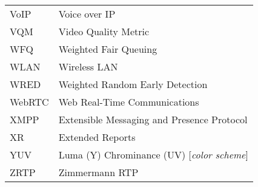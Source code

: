 \begin{longtable}{ll}
VoIP 	& Voice over IP \\
VQM 	& Video Quality Metric \\ 
WFQ 	& Weighted Fair Queuing \\
WLAN	& Wireless LAN \\
WRED 	& Weighted Random Early Detection \\
WebRTC	& Web Real-Time Communications \\
XMPP 	& Extensible Messaging and Presence Protocol \\
XR  	& Extended Reports \\
YUV 	& Luma (Y) Chrominance (UV) [\textit{color scheme}] \\
ZRTP 	& Zimmermann RTP \\
\end{longtable}
